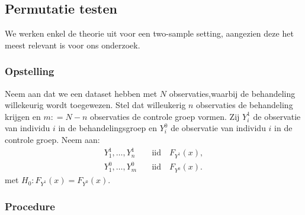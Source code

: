 \documentclass[12pt, a4paper, faculty=we]{ugent-doc}
\begin{document}
\subsection{Permutatie testen}

\begin{flushleft}
    We werken enkel de theorie uit voor een two-sample setting, aangezien deze het meest relevant is voor ons onderzoek.
\end{flushleft}

\subsubsection{Opstelling}

\begin{flushleft}
    Neem aan dat we een dataset hebben met \(N\) observaties,waarbij de behandeling willekeurig wordt toegewezen.
    Stel dat willeukerig \(n\) observaties de behandeling krijgen en \(m : = N-n\) observaties de controle groep vormen.
    Zij \(Y^1_i\) de observatie van individu \(i\) in de behandelingsgroep en \(Y^0_i\) de observatie van individu \(i\) in de controle groep.
    Neem aan:
    \[
    \begin{aligned}
        Y^1_1, \ldots, Y^1_n &\quad \text{iid} \quad F_{Y^1}(x), \\
        Y^0_1, \ldots, Y^0_m &\quad \text{iid} \quad F_{Y^0}(x).
    \end{aligned}
    \] met \(H_0 : F_{Y^1}(x) = F_{Y^0}(x)\).
    
\end{flushleft}


\subsubsection{Procedure}
\end{document}
